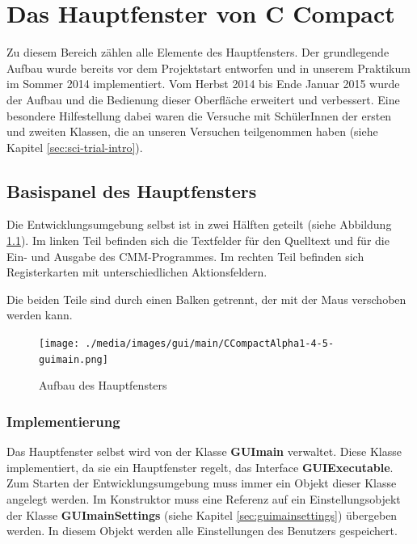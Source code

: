 



\chapter{Das Hauptfenster von C Compact}
\label{sec:gui-main}
Zu diesem Bereich zählen alle Elemente des Hauptfensters. Der grundlegende Aufbau wurde bereits vor dem Projektstart entworfen und in unserem Praktikum im Sommer 2014 implementiert. Vom Herbst 2014 bis Ende Januar 2015 wurde der Aufbau und die Bedienung dieser Oberfläche erweitert und verbessert. Eine besondere Hilfestellung dabei waren die Versuche mit SchülerInnen der ersten und zweiten Klassen, die an unseren Versuchen teilgenommen haben (siehe Kapitel \ref{sec:sci-trial-intro}).

\section{Basispanel des Hauptfensters}
\label{sec:gui-main-1}
Die Entwicklungsumgebung selbst ist in zwei Hälften geteilt (siehe Abbildung \ref{fig:gui-main-1}). Im linken Teil befinden sich die Textfelder für den Quelltext und für die Ein- und Ausgabe des CMM-Programmes. Im rechten Teil befinden sich Registerkarten mit unterschiedlichen Aktionsfeldern.

Die beiden Teile sind durch einen Balken getrennt, der mit der Maus verschoben werden kann.%

\begin{figure}[h] 
  \centering
     \texttt{[image: ./media/images/gui/main/CCompactAlpha1-4-5-guimain.png]}
  \caption{Aufbau des Hauptfensters}
  \label{fig:gui-main-1}
\end{figure}

\subsection{Implementierung}
\label{sec:gui-main-impl}
Das Hauptfenster selbst wird von der Klasse \textbf{GUImain} verwaltet. Diese Klasse implementiert, da sie ein Hauptfenster regelt, das Interface \textbf{GUIExecutable}. Zum Starten der Entwicklungsumgebung muss immer ein Objekt dieser Klasse angelegt werden. Im Konstruktor muss eine Referenz auf ein Einstellungsobjekt der Klasse \textbf{GUImainSettings} (siehe Kapitel \ref{sec:guimainsettings}) übergeben werden. In diesem Objekt werden alle Einstellungen des Benutzers gespeichert.


